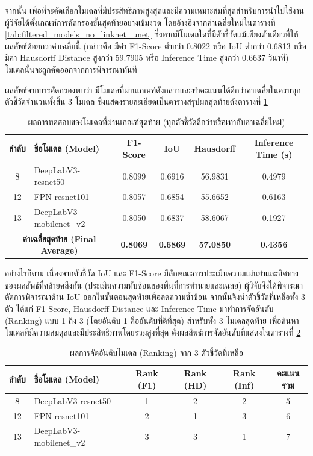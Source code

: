 จากนั้น เพื่อที่จะคัดเลือกโมเดลที่มีประสิทธิภาพสูงสุดและมีความเหมาะสมที่สุดสำหรับการนำไปใช้งาน ผู้วิจัยได้ตั้งเกณฑ์การคัดกรองขั้นสุดท้ายอย่างเข้มงวด โดยอ้างอิงจากค่าเฉลี่ยใหม่ในตารางที่ \ref{tab:filtered_models_no_linknet_unet} ซึ่งหากมีโมเดลใดที่มีตัวชี้วัดแม้เพียงตัวเดียวที่ให้ผลลัพธ์ด้อยกว่าค่าเฉลี่ยนี้ (กล่าวคือ มีค่า F1-Score ต่ำกว่า 0.8022 หรือ IoU ต่ำกว่า 0.6813 หรือมีค่า Hausdorff Distance สูงกว่า 59.7905 หรือ Inference Time สูงกว่า 0.6637 วินาที) โมเดลนั้นจะถูกคัดออกจากการพิจารณาทันที

ผลลัพธ์จากการคัดกรองพบว่า มีโมเดลที่ผ่านเกณฑ์ดังกล่าวและทำคะแนนได้ดีกว่าค่าเฉลี่ยในครบทุกตัวชี้วัดจำนวนทั้งสิ้น 3 โมเดล ซึ่งแสดงรายละเอียดเป็นตารางสรุปผลสุดท้ายดังตารางที่ \ref{tab:final_filtered_models}

\begin{table}[hbt!]
\centering
\caption{ผลการทดสอบของโมเดลที่ผ่านเกณฑ์สุดท้าย (ทุกตัวชี้วัดดีกว่าหรือเท่ากับค่าเฉลี่ยใหม่)}
\label{tab:final_filtered_models}
\begin{tabular}{|c|l|c|c|c|c|}
\hline
\textbf{ลำดับ} & \textbf{ชื่อโมเดล (Model)} & \textbf{F1-Score} & \textbf{IoU} & \textbf{Hausdorff} & \textbf{Inference Time (s)} \\
\hline
8 & DeepLabV3-resnet50 & 0.8099 & 0.6916 & 56.9831 & 0.4979 \\
12 & FPN-resnet101 & 0.8057 & 0.6854 & 55.6652 & 0.6163 \\
13 & DeepLabV3-mobilenet\_v2 & 0.8050 & 0.6837 & 58.6067 & 0.1927 \\
\hline
\multicolumn{2}{|c|}{\textbf{ค่าเฉลี่ยสุดท้าย (Final Average)}} & \textbf{0.8069} & \textbf{0.6869} & \textbf{57.0850} & \textbf{0.4356} \\
\hline
\end{tabular}
\end{table}

อย่างไรก็ตาม เนื่องจากตัวชี้วัด IoU และ F1-Score มีลักษณะการประเมินความแม่นยำและทิศทางของผลลัพธ์ที่คล้ายคลึงกัน (ประเมินความทับซ้อนของพื้นที่การทำนายและเฉลย) ผู้วิจัยจึงได้พิจารณาตัดการพิจารณาด้าน IoU ออกในขั้นตอนสุดท้ายเพื่อลดความซ้ำซ้อน จากนั้นจึงนำตัวชี้วัดที่เหลือทั้ง 3 ตัว ได้แก่ F1-Score, Hausdorff Distance และ Inference Time มาทำการจัดอันดับ (Ranking) แบบ 1 ถึง 3 (โดยอันดับ 1 คืออันดับที่ดีที่สุด) สำหรับทั้ง 3 โมเดลสุดท้าย เพื่อค้นหาโมเดลที่มีความสมดุลและมีประสิทธิภาพโดยรวมสูงที่สุด ดังผลลัพธ์การจัดอันดับที่แสดงในตารางที่ \ref{tab:model_ranking}

\begin{table}[hbt!]
\centering
\caption{ผลการจัดอันดับโมเดล (Ranking) จาก 3 ตัวชี้วัดที่เหลือ}
\label{tab:model_ranking}
\begin{tabularx}{\textwidth}{|c|>{\raggedright\arraybackslash}X|c|c|c|c|} %
\hline
\textbf{ลำดับ} & \textbf{ชื่อโมเดล (Model)} & \textbf{Rank (F1)} & \textbf{Rank (HD)} & \textbf{Rank (Inf)} & \textbf{คะแนนรวม} \\
\hline
8 & DeepLabV3-resnet50 & 1 & 2 & 2 & \textbf{5} \\
12 & FPN-resnet101 & 2 & 1 & 3 & 6 \\
13 & DeepLabV3-mobilenet\_v2 & 3 & 3 & 1 & 7 \\
\hline
\end{tabularx}
\end{table}

